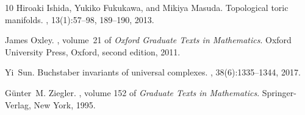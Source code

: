\documentclass[10pt,a4paper]{amsart}
\theoremstyle{plain}
\numberwithin{equation}{section}
\theoremstyle{remark}
\theoremstyle{definition}
\begin{document}
\begin{thebibliography}{10}
Hiroaki Ishida, Yukiko Fukukawa, and Mikiya Masuda.
\newblock Topological toric manifolds.
, 13(1):57--98, 189--190, 2013.

James Oxley.
, volume~21 of {\em Oxford Graduate Texts in Mathematics}.
\newblock Oxford University Press, Oxford, second edition, 2011.

Yi~Sun.
\newblock Buchstaber invariants of universal complexes.
, 38(6):1335--1344, 2017.

G{\"u}nter~M. Ziegler.
, volume 152 of {\em Graduate Texts in Mathematics}.
\newblock Springer-Verlag, New York, 1995.

\end{thebibliography}
\end{document}
